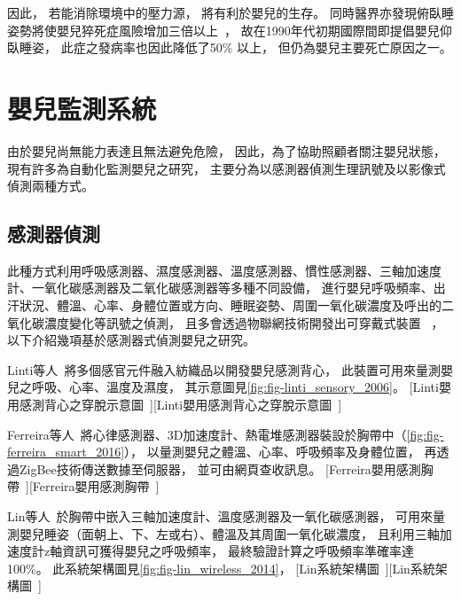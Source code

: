 \documentclass[class=NCU_thesis, crop=false]{standalone}
\begin{document}
因此，
若能消除環境中的壓力源，
將有利於嬰兒的生存。
同時醫界亦發現俯臥睡姿勢將使嬰兒猝死症風險增加三倍以上~\cite{willinger_infant_1994}，
故在1990年代初期國際間即提倡嬰兒仰臥睡姿，
此症之發病率也因此降低了50\% 以上，
但仍為嬰兒主要死亡原因之一。

\section{嬰兒監測系統}
由於嬰兒尚無能力表達且無法避免危險，
因此，為了協助照顧者關注嬰兒狀態，
現有許多為自動化監測嬰兒之研究，
主要分為以感測器偵測生理訊號及以影像式偵測兩種方式。

\subsection{感測器偵測}
此種方式利用呼吸感測器、濕度感測器、溫度感測器、慣性感測器、三軸加速度計、一氧化碳感測器及二氧化碳感測器等多種不同設備，
進行嬰兒呼吸頻率、出汗狀況、體溫、心率、身體位置或方向、睡眠姿勢、周圍一氧化碳濃度及呼出的二氧化碳濃度變化等訊號之偵測，
且多會透過物聯網技術開發出可穿戴式裝置
~\cite{klingeberg_mobile_2012, zhou_low_2015, bouwstra_smart_2009, malhi_zigbee-based_2012, gonzalez-valenzuela_mobility_2011, 
darwish_wearable_2011, ko_wireless_2010, linti_sensory_2006, ferreira_smart_2016, lin_wireless_2014}，
以下介紹幾項基於感測器式偵測嬰兒之研究。

Linti等人~\cite{linti_sensory_2006}將多個感官元件融入紡織品以開發嬰兒感測背心，
此裝置可用來量測嬰兒之呼吸、心率、溫度及濕度，
其示意圖見\cref{fig:fig-linti_sensory_2006}。
[Linti嬰用感測背心之穿脫示意圖~\cite{linti_sensory_2006}][Linti嬰用感測背心之穿脫示意圖~\cite{linti_sensory_2006}]

Ferreira等人~\cite{ferreira_smart_2016}將心律感測器、3D加速度計、熱電堆感測器裝設於胸帶中（\cref{fig:fig-ferreira_smart_2016}），
以量測嬰兒之體溫、心率、呼吸頻率及身體位置，
再透過ZigBee技術傳送數據至伺服器，
並可由網頁查收訊息。
[Ferreira嬰用感測胸帶~\cite{ferreira_smart_2016}][Ferreira嬰用感測胸帶~\cite{ferreira_smart_2016}]

Lin等人~\cite{lin_wireless_2014}於胸帶中嵌入三軸加速度計、溫度感測器及一氧化碳感測器，
可用來量測嬰兒睡姿（面朝上、下、左或右）、體溫及其周圍一氧化碳濃度，
且利用三軸加速度計z軸資訊可獲得嬰兒之呼吸頻率，
最終驗證計算之呼吸頻率準確率達100\%。
此系統架構圖見\cref{fig:fig-lin_wireless_2014}，
[Lin系統架構圖~\cite{lin_wireless_2014}][Lin系統架構圖~\cite{lin_wireless_2014}]
\end{document}
